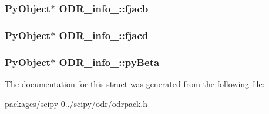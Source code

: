\subsubsection[{fjacb}]{\setlength{\rightskip}{0pt plus 5cm}Py\+Object$\ast$ O\+D\+R\+\_\+info\+\_\+\+::fjacb}\label{structODR__info___a78a055cec8ab46ee5a74b5c3f73e023a}
\hypertarget{structODR__info___ac4baf6dfdeb227c252eb18a8fa8a83b4}{}
\subsubsection[{fjacd}]{\setlength{\rightskip}{0pt plus 5cm}Py\+Object$\ast$ O\+D\+R\+\_\+info\+\_\+\+::fjacd}\label{structODR__info___ac4baf6dfdeb227c252eb18a8fa8a83b4}
\hypertarget{structODR__info___a06561c8fbe68a612e9e536774914c895}{}
\subsubsection[{py\+Beta}]{\setlength{\rightskip}{0pt plus 5cm}Py\+Object$\ast$ O\+D\+R\+\_\+info\+\_\+\+::py\+Beta}\label{structODR__info___a06561c8fbe68a612e9e536774914c895}


The documentation for this struct was generated from the following file\+:\begin{DoxyCompactItemize}
\item 
packages/scipy-\/0../scipy/odr/\hyperlink{odrpack_8h}{odrpack.\+h}\end{DoxyCompactItemize}
